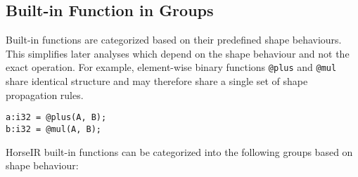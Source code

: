 

\subsection{Built-in Function in Groups}\label{SubSec:groups}

Built-in functions are categorized based on their predefined shape behaviours.
This simplifies later analyses which depend on the shape behaviour and not
the exact operation. For example, element-wise binary functions \texttt{@plus}
and \texttt{@mul} share identical structure and may therefore share a single
set of shape propagation rules.
\begin{small}
\begin{Verbatim}[xleftmargin=.3\columnwidth]
a:i32 = @plus(A, B);
b:i32 = @mul(A, B);
\end{Verbatim}
\end{small}
HorseIR built-in functions can be categorized into the following groups based
on shape behaviour:

